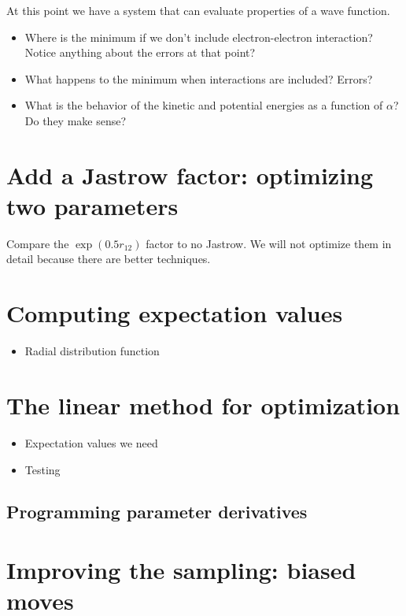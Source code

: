 \documentclass[12pt]{article}
\begin{document}
At this point we have a system that can evaluate properties of a wave function. 

\begin{itemize}
\item Where is the minimum if we don't include electron-electron interaction? Notice anything about the errors at that point?
\item What happens to the minimum when interactions are included? Errors?
\item What is the behavior of the kinetic and potential energies as a function of $\alpha$? Do they make sense?	
\end{itemize}


\section{Add a Jastrow factor: optimizing two parameters} 

Compare the $\exp(0.5r_{12})$ factor to no Jastrow. We will not optimize them in detail because there are better techniques.

\section{Computing expectation values}

\begin{itemize}
\item Radial distribution function	
\end{itemize}

\section{The linear method for optimization} 

\begin{itemize}
\item Expectation values we need
\item Testing 
\end{itemize}

\subsection{Programming parameter derivatives}


\section{Improving the sampling: biased moves} 
\end{document}
